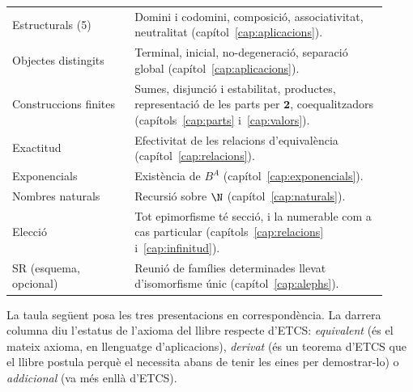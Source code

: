 \begin{center}\small
\begin{tabular}{@{}>{\raggedright\arraybackslash}p{0.30\linewidth}>{\raggedright\arraybackslash}p{0.62\linewidth}@{}}
\toprule
\multicolumn{2}{@{}l}{\textbf{Aquest llibre} (primitius: aplicacions; \(\Dom\), \(\Cod\), \(\Com\))}\\
\midrule
Estructurals (5) & Domini i codomini, composició, associativitat, neutralitat (capítol~\ref{cap:aplicacions}).\\
Objectes distingits & Terminal, inicial, no-degeneració, separació global (capítol~\ref{cap:aplicacions}).\\
Construccions finites & Sumes, disjunció i estabilitat, productes, representació de les parts per \(\mathbf2\), coequalitzadors (capítols~\ref{cap:parts} i~\ref{cap:valors}).\\
Exactitud & Efectivitat de les relacions d'equivalència (capítol~\ref{cap:relacions}).\\
Exponencials & Existència de \(B^A\) (capítol~\ref{cap:exponencials}).\\
Nombres naturals & Recursió sobre \(\N\) (capítol~\ref{cap:naturals}).\\
Elecció & Tot epimorfisme té secció, i la numerable com a cas particular (capítols~\ref{cap:relacions} i~\ref{cap:infinitud}).\\
SR (esquema, opcional) & Reunió de famílies determinades llevat d'isomorfisme únic (capítol~\ref{cap:alephs}).\\
\bottomrule
\end{tabular}
\end{center}

La taula següent posa les tres presentacions en correspondència. La darrera
columna diu l'estatus de l'axioma del llibre respecte d'ETCS:
\emph{equivalent} (és el mateix axioma, en llenguatge d'aplicacions),
\emph{derivat} (és un teorema d'ETCS que el llibre postula perquè el
necessita abans de tenir les eines per demostrar-lo) o \emph{addicional}
(va més enllà d'ETCS).

